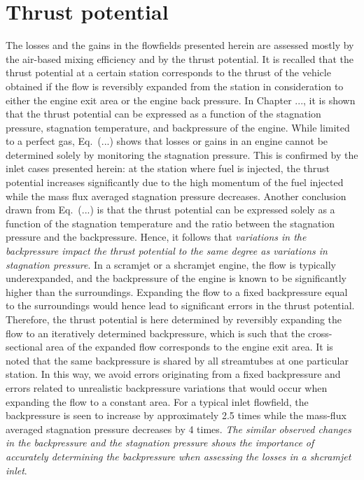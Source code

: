 \section{Thrust potential}

The losses and the gains in the flowfields presented herein are assessed
mostly by the air-based mixing efficiency and by the thrust potential. It is
recalled that the thrust potential at a certain station corresponds
to the thrust of the vehicle obtained if the flow is reversibly expanded
from the station in consideration to either the engine exit area or the engine
back pressure.
In Chapter ..., it is shown that the thrust potential
can be expressed as a function
of the stagnation pressure, stagnation temperature, and backpressure
of the engine. While limited to a perfect gas, Eq.~(...)
shows that losses or gains in an engine cannot be determined solely by monitoring the
stagnation pressure.
This is confirmed by the inlet cases presented herein: at the station where
fuel is injected, the thrust potential increases significantly due to
the high momentum of the fuel injected while the mass flux averaged stagnation pressure
decreases. Another conclusion drawn from Eq.~(...) is that the
thrust potential can be expressed solely as a function of the stagnation temperature
and the ratio between the stagnation pressure and the backpressure. Hence, it follows
that \emph{variations
in the backpressure impact the thrust potential to the same degree as variations
in stagnation pressure}.
In a scramjet or a shcramjet engine, the flow is typically underexpanded, and
the backpressure of the engine is known to be significantly higher than the surroundings.
Expanding the flow to a fixed backpressure equal to the surroundings would hence
lead to significant errors in the thrust potential.
Therefore, the thrust potential is here determined by reversibly expanding the
flow to an iteratively determined backpressure, which is such that the cross-sectional
area of the expanded flow corresponds to the engine exit area. It is noted
that the same backpressure is shared by all streamtubes at one particular
station. In this way, we avoid errors originating
from a fixed backpressure and errors related to unrealistic
backpressure variations that would occur when expanding the flow to a constant area.
For a typical inlet flowfield, the backpressure is seen to increase by approximately
2.5 times while the mass-flux averaged stagnation pressure decreases by 4 times.
\emph{The similar observed changes in the backpressure and the stagnation
pressure shows the importance of accurately determining the backpressure when assessing
the losses in a shcramjet inlet}.

